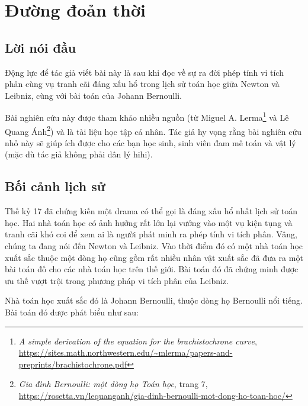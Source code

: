 \documentclass{mynotes}
\begin{document}
\appendix









\chapter{Đường đoản thời}

\section*{Lời nói đầu}

Động lực để tác giả viết bài này là sau khi đọc về sự ra đời phép tính vi tích phân cùng vụ tranh cãi đáng xấu hổ trong lịch sử toán học giữa Newton và Leibniz, cùng với bài toán của Johann Bernoulli. 
        
Bài nghiên cứu này được tham khảo nhiều nguồn (từ Miguel A. Lerma\footnote{\emph{A simple derivation of the equation for the brachistochrone curve}, \url{https://sites.math.northwestern.edu/~mlerma/papers-and-preprints/brachistochrone.pdf}} và Lê Quang Ánh\footnote{\emph{Gia đình Bernoulli: một dòng họ Toán học}, trang 7, \url{https://rosetta.vn/lequanganh/gia-dinh-bernoulli-mot-dong-ho-toan-hoc/}}) và là tài liệu học tập cá nhân. Tác giả hy vọng rằng bài nghiên cứu nhỏ này sẽ giúp ích được cho các bạn học sinh, sinh viên đam mê toán và vật lý (mặc dù tác giả không phải dân lý hihi).

\section*{Bối cảnh lịch sử}

Thế kỷ 17 đã chứng kiến một drama có thể gọi là đáng xấu hổ nhất lịch sử toán học. Hai nhà toán học có ảnh hưởng rất lớn lại vướng vào một vụ kiện tụng và tranh cãi khó coi để xem ai là người phát minh ra phép tính vi tích phân. Vâng, chúng ta đang nói đến Newton và Leibniz. Vào thời điểm đó có một nhà toán học xuất sắc thuộc một dòng họ cũng gồm rất nhiều nhân vật xuất sắc đã đưa ra một bài toán đố cho các nhà toán học trên thế giới. Bài toán đó đã chứng minh được ưu thế vượt trội trong phương pháp vi tích phân của Leibniz.
    
Nhà toán học xuất sắc đó là Johann Bernoulli, thuộc dòng họ Bernoulli nổi tiếng. Bài toán đó được phát biểu như sau:
    
\end{document}
